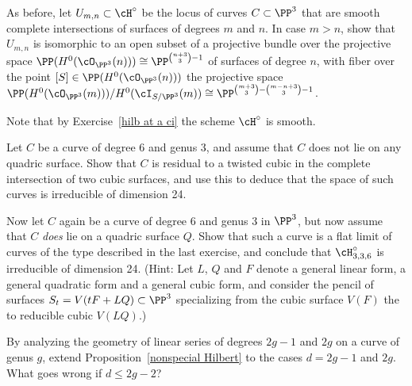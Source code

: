 % 

\begin{exercise}\label{second complete intersection exercise}
As before, let $U_{m,n} \subset \cH^\circ$ be the locus of curves $C \subset \PP^3$ that are smooth complete intersections of surfaces of degrees $m$ and $n$.
 In case $m > n$, show that $U_{m,n}$ is isomorphic to an open subset of a projective bundle over the projective space $\PP(H^0(\cO_{\PP^3}(n))) \cong \PP^{\binom{n+3}{3}-1}$ of surfaces of degree $n$, with fiber over the point $[S] \in \PP(H^0(\cO_{\PP^3}(n)))$ the projective space $\PP(H^0(\cO_{\PP^3}(m)))/H^0(\cI_{S/\PP^3}(m)) \cong \PP^{\binom{m+3}{3} - \binom{m-n+3}{3} - 1}$.
 
 Note that  by Exercise~\ref{hilb at a ci}  the scheme $\cH^\circ$ is smooth.
\end{exercise}

\begin{exercise}\label{6,3:1}
Let $C$ be a curve of degree 6 and genus 3, and assume that $C$ does not lie on any quadric surface. Show that $C$ is residual to a twisted cubic in the complete intersection of two cubic surfaces, and use this to deduce that the space of such curves is irreducible of dimension 24.
\end{exercise}


\begin{exercise}\label{6,3:2}
Now let $C$ again be a curve of degree 6 and genus 3 in $\PP^3$, but now assume that $C$ \emph{does} lie on a quadric surface $Q$. Show that such a curve is a flat limit of curves of the type described in the last exercise, and conclude that $\cH^\circ_{3,3,6}$ is irreducible of dimension 24. (Hint: Let $L$, $Q$ and $F$ denote a general linear form, a general quadratic form and a general cubic form, and consider the pencil of surfaces $S_t = V(tF + LQ) \subset \PP^3$ specializing from the cubic surface $V(F)$ the to reducible cubic $V(LQ)$.)
\end{exercise}

\begin{exercise}
By analyzing the geometry of linear series of degrees $2g-1$ and $2g$ on a curve of genus $g$, extend Proposition~\ref{nonspecial Hilbert} to the cases $d = 2g-1$ and $2g$. What goes wrong if $d \leq 2g-2$?
\end{exercise}

